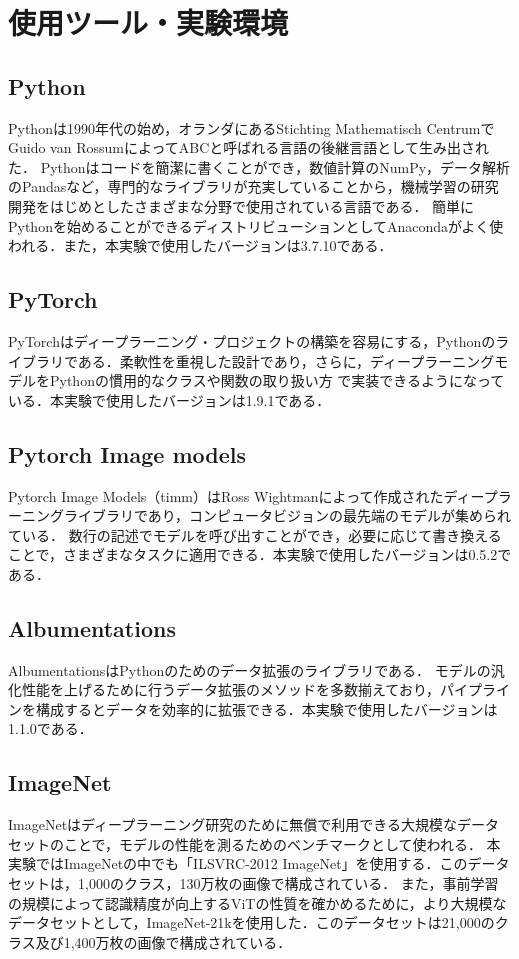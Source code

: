 \documentclass[a4paper, oneside, openany, dvipdfmx]{suribt}%
\begin{document}
\section{使用ツール・実験環境}
\subsection{Python}
Pythonは1990年代の始め，オランダにあるStichting Mathematisch CentrumでGuido van RossumによってABCと呼ばれる言語の後継言語として生み出された\cite{pythondoc}．
Pythonはコードを簡潔に書くことができ，数値計算のNumPy，データ解析のPandasなど，専門的なライブラリが充実していることから，機械学習の研究開発をはじめとしたさまざまな分野で使用されている言語である．
簡単にPythonを始めることができるディストリビューションとしてAnacondaがよく使われる．また，本実験で使用したバージョンは3.7.10である．
\subsection{PyTorch}
PyTorchはディープラーニング・プロジェクトの構築を容易にする，Pythonのライブラリである．柔軟性を重視した設計であり，さらに，ディープラーニングモデルをPythonの慣用的なクラスや関数の取り扱い方
で実装できるようになっている\cite{Eli_Stevens2021-01-30}．本実験で使用したバージョンは1.9.1である．
\subsection{Pytorch Image models}
Pytorch Image Models（timm）はRoss Wightmanによって作成されたディープラーニングライブラリであり，コンピュータビジョンの最先端のモデルが集められている\cite{timmdoc}．
数行の記述でモデルを呼び出すことができ，必要に応じて書き換えることで，さまざまなタスクに適用できる．本実験で使用したバージョンは0.5.2である．
\subsection{Albumentations}
AlbumentationsはPythonのためのデータ拡張のライブラリである．
モデルの汎化性能を上げるために行うデータ拡張のメソッドを多数揃えており，パイプラインを構成するとデータを効率的に拡張できる\cite{info11020125}．本実験で使用したバージョンは1.1.0である．
\subsection{ImageNet}
ImageNetはディープラーニング研究のために無償で利用できる大規模なデータセットのことで，モデルの性能を測るためのベンチマークとして使われる．
本実験ではImageNetの中でも「ILSVRC-2012 ImageNet」を使用する．このデータセットは，1,000のクラス，130万枚の画像で構成されている．
また，事前学習の規模によって認識精度が向上するViTの性質を確かめるために，より大規模なデータセットとして，ImageNet-21kを使用した．このデータセットは21,000のクラス及び1,400万枚の画像で構成されている．
\end{document}

